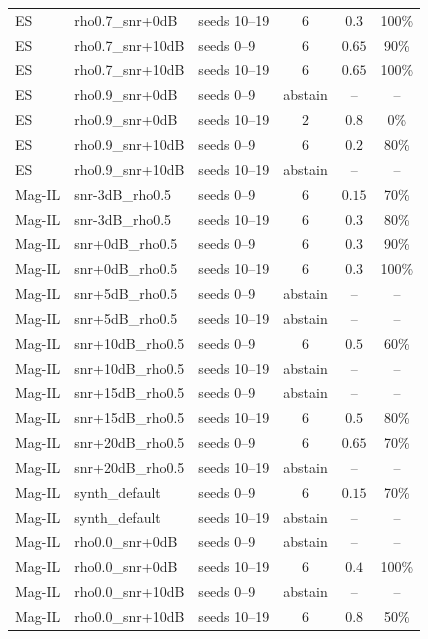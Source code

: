 \begin{longtable}{@{}lllccc@{}}
ES & rho0.7\_snr+0dB & seeds 10--19 & \(6\) & \(0.3\) & 100\% \\
ES & rho0.7\_snr+10dB & seeds 0--9 & \(6\) & \(0.65\) & 90\% \\
ES & rho0.7\_snr+10dB & seeds 10--19 & \(6\) & \(0.65\) & 100\% \\
ES & rho0.9\_snr+0dB & seeds 0--9 & abstain & -- & -- \\
ES & rho0.9\_snr+0dB & seeds 10--19 & \(2\) & \(0.8\) & 0\% \\
ES & rho0.9\_snr+10dB & seeds 0--9 & \(6\) & \(0.2\) & 80\% \\
ES & rho0.9\_snr+10dB & seeds 10--19 & abstain & -- & -- \\
Mag-IL & snr-3dB\_rho0.5 & seeds 0--9 & \(6\) & \(0.15\) & 70\% \\
Mag-IL & snr-3dB\_rho0.5 & seeds 10--19 & \(6\) & \(0.3\) & 80\% \\
Mag-IL & snr+0dB\_rho0.5 & seeds 0--9 & \(6\) & \(0.3\) & 90\% \\
Mag-IL & snr+0dB\_rho0.5 & seeds 10--19 & \(6\) & \(0.3\) & 100\% \\
Mag-IL & snr+5dB\_rho0.5 & seeds 0--9 & abstain & -- & -- \\
Mag-IL & snr+5dB\_rho0.5 & seeds 10--19 & abstain & -- & -- \\
Mag-IL & snr+10dB\_rho0.5 & seeds 0--9 & \(6\) & \(0.5\) & 60\% \\
Mag-IL & snr+10dB\_rho0.5 & seeds 10--19 & abstain & -- & -- \\
Mag-IL & snr+15dB\_rho0.5 & seeds 0--9 & abstain & -- & -- \\
Mag-IL & snr+15dB\_rho0.5 & seeds 10--19 & \(6\) & \(0.5\) & 80\% \\
Mag-IL & snr+20dB\_rho0.5 & seeds 0--9 & \(6\) & \(0.65\) & 70\% \\
Mag-IL & snr+20dB\_rho0.5 & seeds 10--19 & abstain & -- & -- \\
Mag-IL & synth\_default & seeds 0--9 & \(6\) & \(0.15\) & 70\% \\
Mag-IL & synth\_default & seeds 10--19 & abstain & -- & -- \\
Mag-IL & rho0.0\_snr+0dB & seeds 0--9 & abstain & -- & -- \\
Mag-IL & rho0.0\_snr+0dB & seeds 10--19 & \(6\) & \(0.4\) & 100\% \\
Mag-IL & rho0.0\_snr+10dB & seeds 0--9 & abstain & -- & -- \\
Mag-IL & rho0.0\_snr+10dB & seeds 10--19 & \(6\) & \(0.8\) & 50\% \\

\end{longtable}

